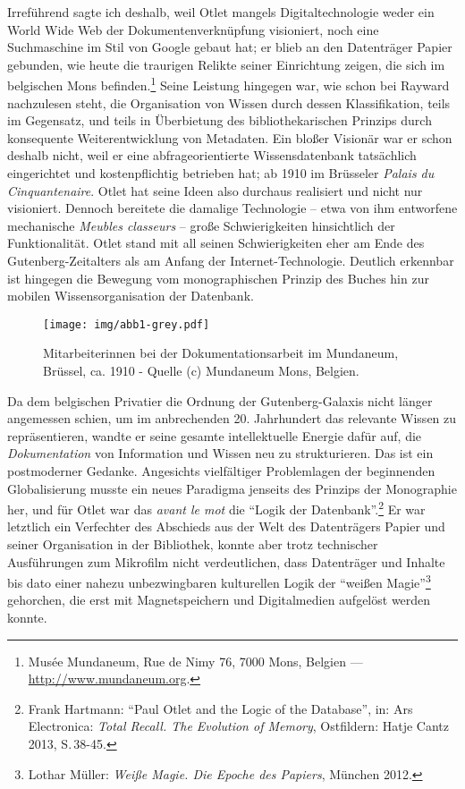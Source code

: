 Irreführend sagte ich deshalb, weil Otlet mangels Digitaltechnologie
weder ein World Wide Web der Dokumentenverknüpfung visioniert, noch eine
Suchmaschine im Stil von Google gebaut hat; er blieb an den Datenträger
Papier gebunden, wie heute die traurigen Relikte seiner Einrichtung
zeigen, die sich im belgischen Mons befinden.\footnote{Musée Mundaneum,
  Rue de Nimy 76, 7000 Mons, Belgien --- \url{http://www.mundaneum.org}.}
Seine Leistung hingegen war, wie schon bei Rayward nachzulesen steht,
die Organisation von Wissen durch dessen Klassifikation, teils im
Gegensatz, und teils in Überbietung des bibliothekarischen Prinzips
durch konsequente Weiterentwicklung von Metadaten. Ein bloßer Visionär
war er schon deshalb nicht, weil er eine abfrageorientierte
Wissensdatenbank tatsächlich eingerichtet und kostenpflichtig betrieben
hat; ab 1910 im Brüsseler \emph{Palais du Cinquantenaire}. Otlet hat
seine Ideen also durchaus realisiert und nicht nur visioniert. Dennoch
bereitete die damalige Technologie -- etwa von ihm entworfene
mechanische \emph{Meubles classeurs} -- große Schwierigkeiten
hinsichtlich der Funktionalität. Otlet stand mit all seinen
Schwierigkeiten eher am Ende des Gutenberg-Zeitalters als am Anfang der
Internet-Technologie. Deutlich erkennbar ist hingegen die Bewegung vom
monographischen Prinzip des Buches hin zur mobilen Wissensorganisation
der Datenbank.

\begin{figure}[htbp]
\centering
\texttt{[image: img/abb1-grey.pdf]}
\caption*{Mitarbeiterinnen bei der Dokumentationsarbeit im Mundaneum,
Brüssel, ca. 1910 - Quelle (c) Mundaneum Mons, Belgien.}
\end{figure}

Da dem belgischen Privatier die Ordnung der Gutenberg-Galaxis nicht
länger angemessen schien, um im anbrechenden 20. Jahrhundert das
relevante Wissen zu repräsentieren, wandte er seine gesamte
intellektuelle Energie dafür auf, die \emph{Dokumentation} von
Information und Wissen neu zu strukturieren. Das ist ein postmoderner
Gedanke. Angesichts vielfältiger Problemlagen der beginnenden
Globalisierung musste ein neues Paradigma jenseits des Prinzips der
Monographie her, und für Otlet war das \emph{avant le mot} die
\enquote{Logik der Datenbank}.\footnote{Frank Hartmann: \enquote{Paul
  Otlet and the Logic of the Database}, in: Ars Electronica: \emph{Total
  Recall. The Evolution of Memory}, Ostfildern: Hatje Cantz 2013, S.\,38-45.} 
Er war letztlich ein Verfechter des Abschieds aus der Welt des
Datenträgers Papier und seiner Organisation in der Bibliothek, konnte
aber trotz technischer Ausführungen zum Mikrofilm nicht verdeutlichen,
dass Datenträger und Inhalte bis dato einer nahezu unbezwingbaren
kulturellen Logik der \enquote{weißen Magie}\footnote{Lothar Müller:
  \emph{Weiße Magie. Die Epoche des Papiers}, München 2012.} gehorchen,
die erst mit Magnetspeichern und Digitalmedien aufgelöst werden konnte.

